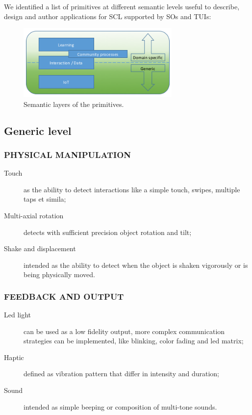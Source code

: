 We identified a list of primitives at different semantic levels useful to describe, design and author applications for SCL supported by SOs and TUIs:

\begin{figure}[htb]
\centering
\includegraphics[width=8cm]{img/primitive_layers}
\caption{Semantic layers of the primitives.}
\label{fig:layers}
\end{figure}


\subsection{Generic level}
\medskip

\subsubsection{PHYSICAL MANIPULATION}
\begin{description}
\item [Touch] as the ability to detect interactions like a simple touch, swipes, multiple taps et simila;
\item [Multi-axial rotation] detects with sufficient precision object rotation and tilt;
\item [Shake and displacement] intended as the ability to detect when the object is shaken vigorously or is being physically moved.
\end{description}

\subsubsection{FEEDBACK AND OUTPUT}
\begin{description}
\item [Led light] can be used as a low fidelity output, more complex communication strategies can be implemented, like blinking, color fading and led matrix;
\item [Haptic] defined as vibration pattern that differ in intensity and duration;
\item [Sound] intended as simple beeping or composition of multi-tone sounds.
\end{description}


